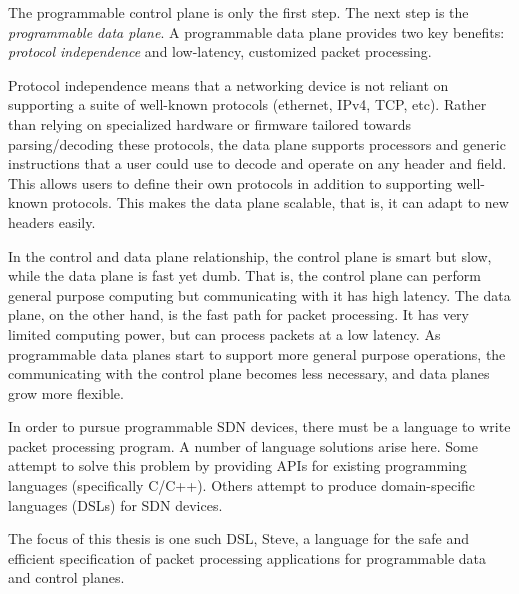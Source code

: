 The programmable control plane is only the first step. The next
step is the \emph{programmable data plane}. A programmable data plane provides
two key benefits: \emph{protocol independence} and low-latency, customized packet
processing.

Protocol independence means that a networking device is not reliant on supporting
a suite of well-known protocols (ethernet, IPv4, TCP, etc).
Rather than relying on specialized hardware or firmware tailored towards parsing/decoding
these protocols, the data plane supports processors
and generic instructions that a user could use to decode and operate on
any header and field.
This allows users to define their own protocols in addition to
supporting well-known protocols. This makes the data plane scalable, that is, it
can adapt to new headers easily.

In the control and data plane relationship,
the control plane is smart but slow, while the data plane is fast yet dumb. That is,
the control plane can perform general purpose computing but communicating with
it has high latency. The data plane, on the other hand, is the fast path for packet processing.
It has very limited computing power, but can process packets at a low latency.
As programmable data planes start to support more general purpose operations,
the communicating with the control plane becomes less necessary, and data planes
grow more flexible.

In order to pursue programmable SDN devices, there must be a language to write
packet processing program. A number of language solutions arise here.
Some attempt to solve this problem by providing APIs for existing programming languages
(specifically C/C++).
Others attempt to produce domain-specific languages (DSLs) for SDN devices.

The focus of this thesis is one such DSL, Steve, a language for the safe and
efficient specification of packet processing applications for programmable data
and control planes.



%
%

